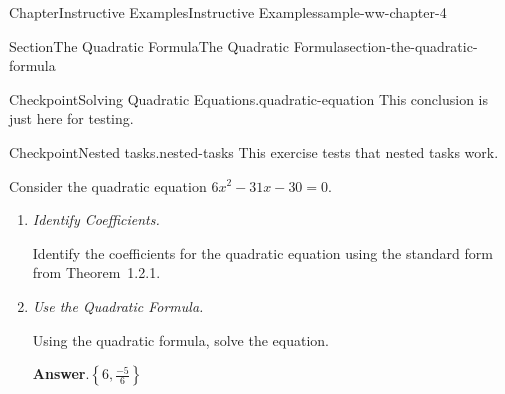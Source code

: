 \documentclass[oneside,10pt,]{book}
\newcommand{\blocktitlefont}{\relax}
\newlength{\fillinmaxwidth}
\newlength{\fillincontract}
\newlength{\charmaxwidth}\setlength{\charmaxwidth}{0.5em}
\newlength{\charminwidth}\setlength{\charminwidth}{0.1em}
\newlength{\fillinheight}
\newcommand{\fillintext}[1]{%
\setlength{\fillinmaxwidth}{#1\charmaxwidth}%
\setlength{\fillincontract}{#1\charminwidth}%
\setlength{\fillinheight}{\baselineskip}\addtolength{\fillinheight}{1.2pt}%
\strut\nobreak\leaders\vbox{\hrule width 0.3pt height 0.3pt \vskip -1.2pt}\hskip 1\fillinmaxwidth minus \fillincontract\nobreak\strut%
}
\newcommand{\lititle}[1]{{\slshape#1}}
\numberwithin{equation}{section}
\begin{document}
\begin{chapterptx}{Chapter}{Instructive Examples}{}{Instructive Examples}{}{}{sample-ww-chapter-4}
\begin{sectionptx}{Section}{The Quadratic Formula}{}{The Quadratic Formula}{}{}{section-the-quadratic-formula}
\begin{inlineexercise}{Checkpoint}{Solving Quadratic Equations.}{quadratic-equation}
This conclusion is just here for testing.%
\end{inlineexercise}%
\begin{inlineexercise}{Checkpoint}{Nested tasks.}{nested-tasks}%
This exercise tests that nested tasks work.%
 \par
Consider the quadratic equation \({6x^{2}-31x-30} = 0\text{.}\)%
\begin{enumerate}[font=\bfseries,label=(\alph*),ref=\alph*]%
\item{}\lititle{Identify Coefficients.}\par%
Identify the coefficients for the quadratic equation using the standard form from Theorem~1.2.1.%
%
\item{}\lititle{Use the Quadratic Formula.}\par%
Using the quadratic formula, solve the equation.%
\par\smallskip%
\noindent\textbf{\blocktitlefont Answer}.\hypertarget{nested-tasks-4-3}{}\quad{}\(\left\{6,\frac{-5}{6}\right\}\)%
\par\smallskip%

\end{enumerate}
\end{inlineexercise}
\end{sectionptx}
\end{chapterptx}
\end{document}
